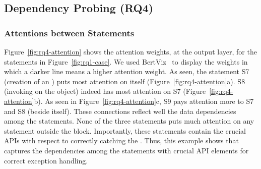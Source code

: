 \subsection{Dependency Probing (RQ4)}
\label{sec:rq4}


\subsubsection{Attentions between Statements}
Figure~\ref{fig:rq4-attention} shows the attention weights, at the
output layer, for the statements in Figure~\ref{fig:rq1-case}. We used
BertViz~\cite{bertviz} to display the weights in which a darker line
means a higher attention weight. As seen, the statement S7 (creation
of an ) puts most attention on itself
(Figure~\ref{fig:rq4-attention}a). S8 (invoking 
on the  object) indeed has most attention on S7
(Figure~\ref{fig:rq4-attention}b). As seen in
Figure~\ref{fig:rq4-attention}c, S9 pays attention more to S7 and S8
(beside itself). These connections reflect well the data dependencies
among the statements. None of the three statements puts much attention
on any statement outside the  block. Importantly, these
statements contain the crucial APIs with respect to correctly catching
the . Thus, this example shows that {\tool} captures
the dependencies among the statements with crucial API elements for
correct exception handling.


